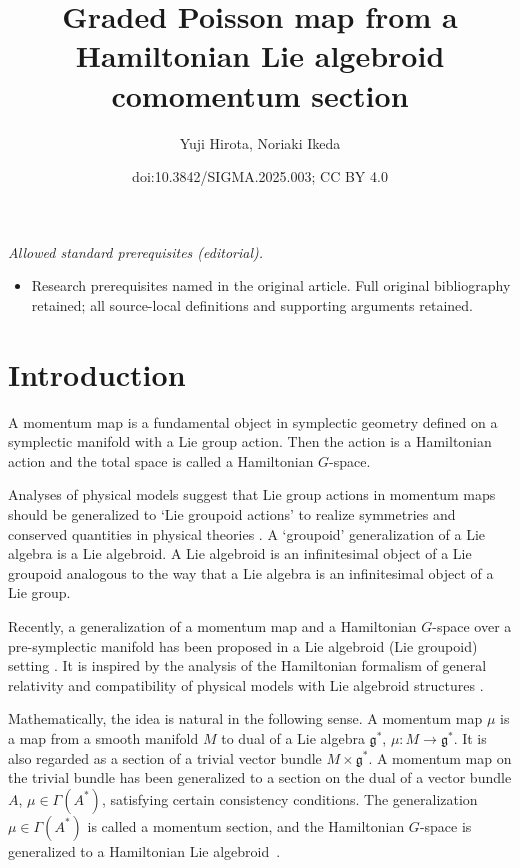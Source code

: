 \documentclass[10pt,a4paper]{amsart}
\title{Graded Poisson map from a Hamiltonian Lie algebroid comomentum section}
\author{Yuji Hirota, Noriaki Ikeda}
\date{doi:10.3842/SIGMA.2025.003; CC BY 4.0}
\numberwithin{equation}{section}
\begin{document}
\maketitle
\noindent\textit{Allowed standard prerequisites (editorial).}\begin{itemize}
\item Research prerequisites named in the original article. Full original bibliography retained; all source-local definitions and supporting arguments retained.
\end{itemize}\medskip
\section{Introduction}

A momentum map is a fundamental object in symplectic geometry
defined on a symplectic manifold with a Lie group action.
Then the action is a Hamiltonian action and the total space is called a Hamiltonian $G$-space.

Analyses of physical models suggest that Lie group actions in momentum maps should be generalized to `Lie groupoid actions' to realize symmetries and conserved quantities in physical theories \cite{Alekseev:2004np, Blohmann:2010jd, Cattaneo:2000iw}.
A `groupoid' generalization of a Lie algebra is a Lie algebroid.
A Lie algebroid is an infinitesimal object of a Lie groupoid analogous to the way that a Lie algebra is an infinitesimal object of a Lie group.

Recently, a generalization of a momentum map and a Hamiltonian $G$-space
over a pre-symplectic manifold
has been proposed in a Lie algebroid (Lie groupoid) setting \cite{Blohmann:2018}.
It is inspired by the analysis of the Hamiltonian formalism of general relativity \cite{Blohmann:2010jd} and compatibility of physical models with Lie algebroid structures \cite{Kotov:2016lpx}.

Mathematically, the idea is natural in the following sense. A momentum map $\mu$ is a map from a smooth manifold $M$
to dual of a Lie algebra $\mathfrak{g}^*$,
$\mu\colon M \rightarrow \mathfrak{g}^*$.
It is also regarded as a section of a trivial vector bundle $M \times \mathfrak{g}^*$.
A momentum map on the trivial bundle has been generalized
to a section on the dual of a vector bundle $A$, $\mu \in \Gamma(A^*)$,
satisfying certain consistency conditions.
The generalization $\mu \in \Gamma(A^*)$ is called a momentum section,
and the Hamiltonian $G$-space is generalized
to a Hamiltonian Lie algebroid~\cite{Blohmann:2018}.
\end{document}
